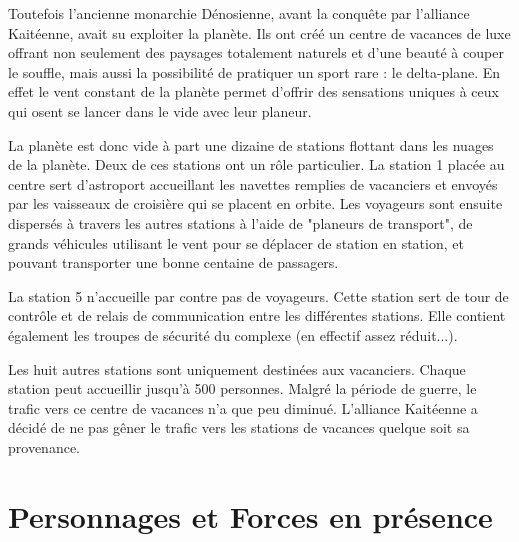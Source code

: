 \begin{multicols}{2}
Toutefois l'ancienne monarchie Dénosienne, avant la conquête par l'alliance Kaitéenne, avait su exploiter la planète. Ils ont créé un centre de vacances de luxe offrant non seulement des paysages totalement naturels et d'une beauté à couper le souffle, mais aussi la possibilité de pratiquer un sport rare : le delta-plane. En effet le vent constant de la planète permet d'offrir des sensations uniques à ceux qui osent se lancer dans le vide avec leur planeur.

La planète est donc vide à part une dizaine de stations flottant dans les nuages de la planète. Deux de ces stations ont un rôle particulier. La station 1 placée au centre sert d'astroport accueillant les navettes remplies de vacanciers et envoyés par les vaisseaux de croisière qui se placent en orbite. Les voyageurs sont ensuite dispersés à travers les autres stations à l'aide de "planeurs de transport", de grands véhicules utilisant le vent pour se déplacer de station en station, et pouvant transporter une bonne centaine de passagers.

La station 5 n'accueille par contre pas de voyageurs. Cette station sert de tour de contrôle et de relais de communication entre les différentes stations. Elle contient également les troupes de sécurité du complexe (en effectif assez réduit...).

Les huit autres stations sont uniquement destinées aux vacanciers. Chaque station peut accueillir jusqu'à 500 personnes. Malgré la période de guerre, le trafic vers ce centre de vacances n'a que peu diminué. L'alliance Kaitéenne a décidé de ne pas gêner le trafic vers les stations de vacances quelque soit sa provenance.

\end{multicols}

\chapter{Personnages et Forces en présence}

